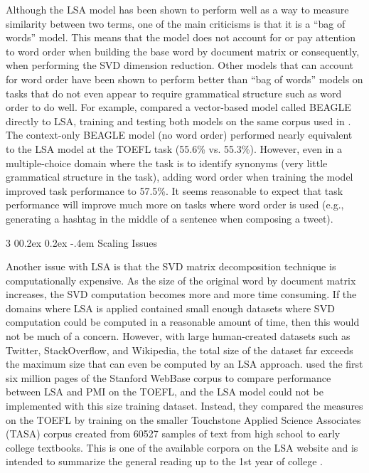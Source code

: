 \documentclass[man,floatsintext,donotrepeattitle]{apa6}
\makeatletter
\renewcommand{\subsubsection}{%
  \@startsection
  {subsubsection}%
  {3}%
  {\parindent}%
  {0\baselineskip \@plus 0.2ex \@minus 0.2ex}%
  {-.4em}%
  {\normalfont\normalsize\bfseries\addperi}}
\makeatother
\begin{document}
Although the LSA model has been shown to perform well as a way to measure similarity between two terms, one of the main criticisms is that it is a ``bag of words'' model.
This means that the model does not account for or pay attention to word order when building the base word by document matrix or consequently, when performing the SVD dimension reduction.
Other models that can account for word order have been shown to perform better than ``bag of words'' models on tasks that do not even appear to require grammatical structure such as word order to do well.
For example, \textcite{Jones2007} compared a vector-based model called BEAGLE directly to LSA, training and testing both models on the same corpus used in \textcite{Landauer1997}.
The context-only BEAGLE model (no word order) performed nearly equivalent to the LSA model at the TOEFL task (\num{55.6}\% vs. \num{55.3}\%).
However, even in a multiple-choice domain where the task is to identify synonyms (very little grammatical structure in the task), adding word order when training the model improved task performance to \num{57.5}\%.
It seems reasonable to expect that task performance will improve much more on tasks where word order is used (e.g., generating a hashtag in the middle of a sentence when composing a tweet).

\subsubsection{Scaling Issues}

Another issue with LSA is that the SVD matrix decomposition technique is computationally expensive.
As the size of the original word by document matrix increases, the SVD computation becomes more and more time consuming.
If the domains where LSA is applied contained small enough datasets where SVD computation could be computed in a reasonable amount of time, then this would not be much of a concern.
However, with large human-created datasets such as Twitter, StackOverflow, and Wikipedia, the total size of the dataset far exceeds the maximum size that can even be computed by an LSA approach.
\textcite{Budiu2007} used the first six million pages of the Stanford WebBase corpus to compare performance between LSA and PMI on the TOEFL, and the LSA model could not be implemented with this size training dataset.
Instead, they compared the measures on the TOEFL by training on the smaller Touchstone Applied Science Associates (TASA) corpus created from \num{60527} samples of text from high school to early college textbooks.
This is one of the available corpora on the LSA website and is intended to summarize the general reading up to the 1st year of college \parencite{Budiu2007}.
\end{document}
